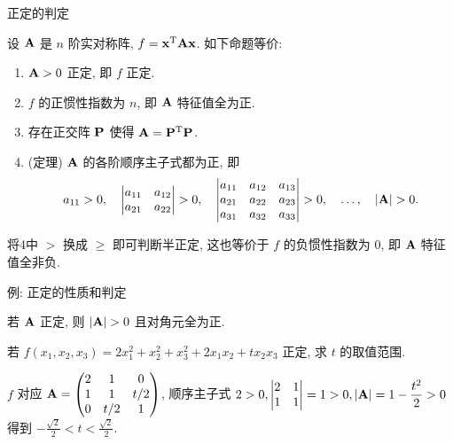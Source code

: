 \begin{frame}{正定的判定}
	\onslide<+->
	\begin{theorem}
		设 ${\mathbf{A}}$ 是 $n$ 阶实对称阵, $f={\mathbf{x}}^{\mathrm{T}}{\mathbf{A}}{\mathbf{x}}$. 如下命题等价:
		\begin{enumerate}
			\item ${\mathbf{A}}>0$ 正定, 即 $f$ 正定.
			\item $f$ 的正惯性指数为 $n$, 即 ${\mathbf{A}}$ 特征值全为正.
			\item 存在正交阵 ${\mathbf{P}}$ 使得 ${\mathbf{A}}={\mathbf{P}}^{\mathrm{T}}{\mathbf{P}}$.
			\item (定理) ${\mathbf{A}}$ 的各阶顺序主子式都为正, 即
			\[a_{11}>0,\quad
			\begin{vmatrix}
				a_{11}&a_{12}\\
				a_{21}&a_{22}
			\end{vmatrix}>0,\quad
			\begin{vmatrix}
				a_{11}&a_{12}&a_{13}\\
				a_{21}&a_{22}&a_{23}\\
				a_{31}&a_{32}&a_{33}
			\end{vmatrix}>0,\quad
			\dots,\quad
			|\bfA|>0.\]
		\end{enumerate}
	\end{theorem}
	\onslide<+->
	将\enumnum4中 $>$ 换成 $\ge$ 即可判断半正定, 这也等价于 $f$ 的负惯性指数为 $0$, 即 ${\mathbf{A}}$ 特征值全非负.
\end{frame}


\begin{frame}{例: 正定的性质和判定}
	\onslide<+->
	\begin{corollary}
		若 ${\mathbf{A}}$ 正定, 则 $|\bfA|>0$ 且对角元全为正.
	\end{corollary}
	\onslide<+->
	\begin{example}
		若 $f(x_1,x_2,x_3)=2x_1^2+x_2^2+x_3^2+2x_1x_2+tx_2x_3$ 正定, 求 $t$ 的取值范围.
	\end{example}
	\onslide<+->
	\begin{solution}
		$f$ 对应 ${\mathbf{A}}=\begin{pmatrix}
			2&1&0\\
			1&1&t/2\\
			0&t/2&1
		\end{pmatrix}$, 顺序主子式 $2>0,\begin{vmatrix}
			2&1\\1&1
		\end{vmatrix}=1>0,|{\mathbf{A}}|=1-\dfrac{t^2}2>0$
		得到 $\displaystyle-\frac{\sqrt2}2<t<\frac{\sqrt2}2$.
	\end{solution}
\end{frame}


